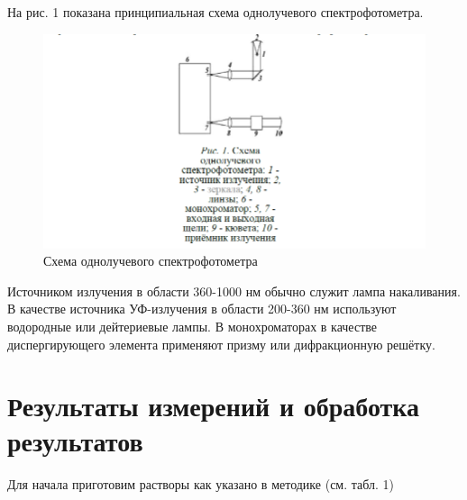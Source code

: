 \documentclass[a4paper,12pt]{article}
\begin{document}
На рис. 1 показана принципиальная схема однолучевого спектрофотометра.

\begin{figure}[H]
    \centering
    \includegraphics[scale=0.75]{Спектрофотометр.png}
    \centering
    \caption{Схема однолучевого спектрофотометра}
\end{figure}

Источником излучения в области 360-1000 нм обычно служит лампа накаливания. В качестве источника УФ-излучения в области 200-360 нм используют водородные или дейтериевые лампы. В монохроматорах в качестве диспергирующего элемента применяют призму или дифракционную решётку.

\section*{Результаты измерений и обработка результатов}

Для начала приготовим растворы как указано в методике (см. табл. 1)
\end{document}

